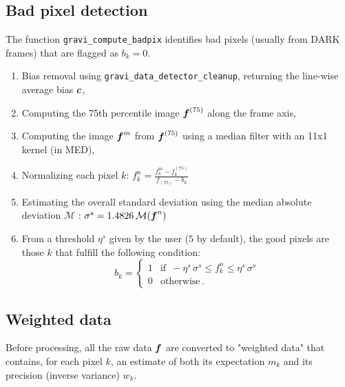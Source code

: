 \documentclass[a4paper,11pt,twoside]{scrartcl}
\newcommand{\rd}{f} %
\newcommand{\bias}{c}
\newcommand{\data}{m}
\begin{document}
\subsection{Bad pixel detection}
The function \verb|gravi_compute_badpix| identifies bad pixels (usually from DARK frames) that are flagged as $b_k=0$. 
\begin{enumerate}
    \item Bias removal using \verb|gravi_data_detector_cleanup|, returning the line-wise average bias $\V{\bias}$,
    \item Computing the 75th percentile image $\V\rd^{(75)}$ along the frame axis,
    \item Computing the image $\V\rd^{m} $ from $\V\rd^{(75)}$ using a median filter with an 11x1 kernel (in MED),
    \item Normalizing each pixel $k$: $         \rd_k^n = \frac{\rd_k^{m} -\rd_k^{(75)}}{\rd_{(75)} - b_k}$  
    \item Estimating the overall standard deviation using the median absolute deviation $\mathcal{M}$ : $\sigma^s =  1.4826\, \mathcal{M}(\V\rd^n)$
    \item From a threshold $\eta^s$  given by the user ($5$ by default), the good pixels are those $k$ that fulfill the following condition:
    \begin{equation}
        b_k = \left\{ \begin{array}{cl}
                1 & \text{if }\, -\eta^s \,\sigma^s \leq \rd_k^n \leq \eta^s \,\sigma^s \\
     0 & \text{otherwise}\,.
      \end{array}
        \right.
    \end{equation}
    
\end{enumerate} 

\subsection{Weighted data}

Before processing, all the raw data $\boldsymbol{f}$ are converted to "weighted data" that contains, for each pixel $k$, an estimate of both its expectation $\data_k$ and its precision (inverse variance) $w_k$. 
\end{document}
